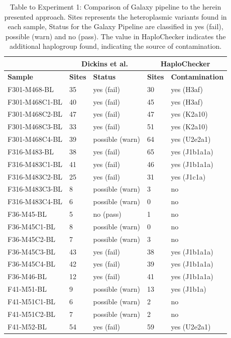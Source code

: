 \begin{enumerate}
\begin{table}[]
\centering
\caption[Table to Experiment 1]{Table to Experiment 1: Comparison of Galaxy pipeline to the herein presented approach. Sites represents the heteroplasmic variants found in each sample, Status for the Galaxy Pipeline are classified in yes (fail), possible (warn) and no (pass). The value in HaploChecker indicates the additional haplogroup found, indicating the source of contamination. }
\label{comptable}
\begin{tabular}{|l|ll|ll|}
\hline
     & \multicolumn{2}{c|}{\textbf{Dickins et al.}} & \multicolumn{2}{c|}{\textbf{HaploChecker}} \\
\hline
\textbf{Sample}       & \textbf{Sites}     & \textbf{Status}     & \textbf{Sites}        & \textbf{Contamination}        \\
F301-M468-BL &35 & yes (fail) &30 &yes (H3af) \\
F301-M468C1-BL &40 & yes (fail) &45 &yes (H3af) \\
F301-M468C2-BL &47 & yes (fail) &47 &yes (K2a10) \\
F301-M468C3-BL &33 & yes (fail) &51 &yes (K2a10)  \\
F301-M468C4-BL &39 &possible (warn) &64 &yes (U2e2a1) \\
F316-M483-BL &38 & yes (fail) &65 &yes (J1b1a1a) \\
F316-M483C1-BL &41 &yes (fail) &46 &yes (J1b1a1a) \\
F316-M483C2-BL &25 & yes (fail) &31 &yes (J1c1a) \\
F316-M483C3-BL &8 &possible (warn) &3 & no\\
F316-M483C4-BL &6 &possible (warn) &0 & no \\
F36-M45-BL &5 &no (pass) &1 & no\\
F36-M45C1-BL &8 &possible (warn) &0 & no \\
F36-M45C2-BL &7 &possible (warn) &3 & no\\
F36-M45C3-BL &43 & yes (fail) &38 &yes (J1b1a1a) \\
F36-M45C4-BL &42 & yes (fail) &39 &yes (J1b1a1a) \\
F36-M46-BL &12 & yes (fail) &41 &yes (J1b1a1a) \\
F41-M51-BL &9 &possible (warn) &13 &yes (J1b1a) \\
F41-M51C1-BL &6 &possible (warn) &2 & no\\
F41-M51C2-BL &7 &possible (warn) &2 & no\\
F41-M52-BL &54 &yes (fail) &59 &yes (U2e2a1) \\

\end{tabular}
\end{table}
\end{enumerate}
